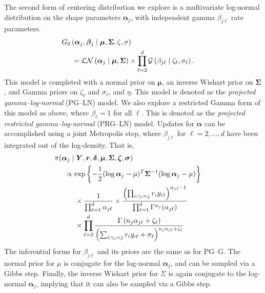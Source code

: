 \documentclass[iicol,sn-basic]{sn-jnl}
\theoremstyle{thmstyleone}
\begin{document}
The second form of centering distribution we explore is a multivariate log-normal distribution on the shape parameters $\bm{\alpha}_j$, with independent gamma $\beta_{j\ell}$ rate parameters.
\begin{equation}
\begin{aligned}
&\hspace{-0.5cm}G_0\left(\bm{\alpha}_j,\bm{\beta}_j\mid\bm{\mu},\bm{\Sigma},\zeta,\sigma\right) \\
&=\mathcal{LN}\left(\bm{\alpha}_j\mid\bm{\mu},\bm{\Sigma}\right)\times\prod_{\ell = 2}^d\mathcal{G}\left(\beta_{j\ell}\mid\zeta_{\ell},\sigma_{\ell}\right).
\end{aligned}
\end{equation}
This model is completed with a normal prior on $\bm{\mu}$, an inverse Wishart prior on $\bm{\Sigma}$, and Gamma priors on $\zeta_{\ell}$ and $\sigma_{\ell}$, and $\eta$.  This model is denoted as the \emph{projected gamma--log-normal} (PG--LN) model.  We also explore a restricted Gamma form of this model as above, where
$\beta_{\ell} = 1$ for all $\ell$.  This is denoted as the \emph{projected restricted gamma--log-normal} (PRG--LN) model.  Updates for $\bm{\alpha}$ can be accomplished using a joint Metropolis step, where $\beta_{j\ell}$ for $\ell = 2,\ldots,d$ have been integrated out of the log-density.  That is,
\begin{equation*}
\begin{aligned}
&\hspace{-0.5cm}\pi(\bm{\alpha}_j\mid\bm{Y},\bm{r},\bm{\delta},\bm{\mu},\bm{\Sigma},\bm{\zeta},\bm{\sigma})\\
&\propto \exp\left\lbrace-\frac{1}{2}(\log\bm{\alpha}_j - \mu)^T\bm{\Sigma}^{-1}(\log\bm{\alpha}_j - \mu)\right\rbrace \\
&\hspace{0.5cm}\times\frac{1}{\prod_{\ell = 1}^d\alpha_{j\ell}}\times \frac{\left(\prod_{i:\gamma_i = j}r_iy_{i1}\right)^{\alpha_{j1} - 1}}{\prod_{\ell = 1}^d\Gamma^{n_j}(\alpha_{j\ell})}\\
&\hspace{0.5cm}\times \prod_{\ell = 2}^d\frac{\Gamma\left(n_j\alpha_{j\ell} + \zeta_{\ell}\right)}{\left(\sum_{i:\gamma_i = j}r_iy_{i\ell} + \sigma_{\ell}\right)^{n_j\alpha_{j\ell} + \zeta_{\ell}}}
\end{aligned}
\end{equation*}
The inferential forms for $\beta_{j\ell}$ and its priors are the same as for PG--G.  The normal prior for $\mu$ is conjugate for the log-normal $\bm{\alpha}_j$, and can be sampled via a Gibbs step.  Finally, the inverse Wishart prior for $\Sigma$ is again conjugate to the log-normal $\bm{\alpha}_j$, implying that it can also be sampled via a Gibbs step.
\end{document}
